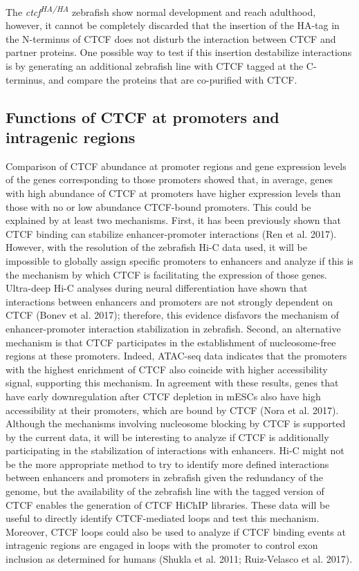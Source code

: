 The \textit{ctcf\textsuperscript{HA/HA}} zebrafish show normal development and reach adulthood, however, it cannot be completely discarded that the insertion of the HA-tag in the N-terminus of CTCF does not disturb the interaction between CTCF and partner proteins. One possible way to test if this insertion destabilize interactions is by generating an additional zebrafish line with CTCF tagged at the C-terminus, and compare the proteins that are co-purified with CTCF.\\

		\subsection{Functions of CTCF at promoters and intragenic regions}

Comparison of CTCF abundance at promoter regions and gene expression levels of the genes corresponding to those promoters showed that, in average, genes with high abundance of CTCF at promoters have higher expression levels than those with no or low abundance CTCF-bound promoters. This could be explained by at least two mechanisms. First, it has been previously shown that CTCF binding can stabilize enhancer-promoter interactions (Ren et al. 2017). However, with the resolution of the zebrafish Hi-C data used, it will be impossible to globally assign specific promoters to enhancers and analyze if this is the mechanism by which CTCF is facilitating the expression of those genes. Ultra-deep Hi-C analyses during neural differentiation have shown that interactions between enhancers and promoters are not strongly dependent on CTCF (Bonev et al. 2017); therefore, this evidence disfavors the mechanism of enhancer-promoter interaction stabilization in zebrafish. Second, an alternative mechanism is that CTCF participates in the establishment of nucleosome-free regions at these promoters. Indeed, ATAC-seq data indicates that the promoters with the highest enrichment of CTCF also coincide with higher accessibility signal, supporting this mechanism. In agreement with these results, genes that have early downregulation after CTCF depletion in mESCs also have high accessibility at their promoters, which are bound by CTCF (Nora et al. 2017). Although the mechanisms involving nucleosome blocking by CTCF is supported by the current data, it will be interesting to analyze if CTCF is additionally participating in the stabilization of interactions with enhancers. Hi-C might not be the more appropriate method to try to identify more defined interactions between enhancers and promoters in zebrafish given the redundancy of the genome, but the availability of the zebrafish line with the tagged version of CTCF enables the generation of CTCF HiChIP libraries. These data will be useful to directly identify CTCF-mediated loops and test this mechanism. Moreover, CTCF loops could also be used to analyze if CTCF binding events at intragenic regions are engaged in loops with the promoter to control exon inclusion as determined for humans (Shukla et al. 2011; Ruiz-Velasco et al. 2017).\\


